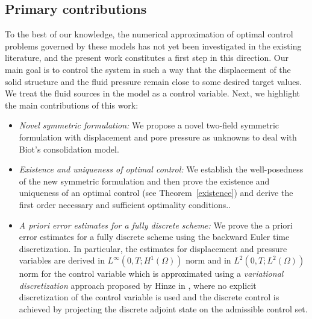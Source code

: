 \documentclass{amsart}
\begin{document}
\subsection{Primary contributions}
To the best of our knowledge, the numerical approximation of optimal control problems governed by these models has not yet been investigated in the existing literature, and the present work constitutes a first step in this direction. Our main goal is to control the system in such a way that the displacement of the solid structure and the fluid pressure remain close to some desired target values. We treat the fluid sources in the model as a control variable. Next, we highlight the main contributions of this work:
\begin{itemize}
	\item \textit{Novel symmetric formulation:} We propose a novel two-field symmetric formulation with displacement and pore pressure as unknowns to deal with Biot's consolidation model.
	\item \textit{Existence and uniqueness of optimal control:} We establish the well-posedness of the new symmetric formulation and then prove the existence and uniqueness of an optimal control (see Theorem~\ref{existence}) and derive the first order necessary and sufficient optimality conditions..
	\item \textit{A priori error estimates for a fully discrete scheme:} We prove the a priori error estimates for a fully discrete scheme using the backward Euler time discretization. In particular, the estimates for displacement and pressure variables are derived in $L^{\infty}(0,T;H^{1}(\Omega))$ norm and in $L^{2}(0,T;L^{2}(\Omega))$ norm for the control variable which is approximated using a \textit{variational discretization} approach proposed by Hinze in \cite{MR2122182}, where no explicit discretization of the control variable is used and the discrete control is achieved by projecting the discrete adjoint state on the admissible control set.
\end{itemize}
\end{document}
